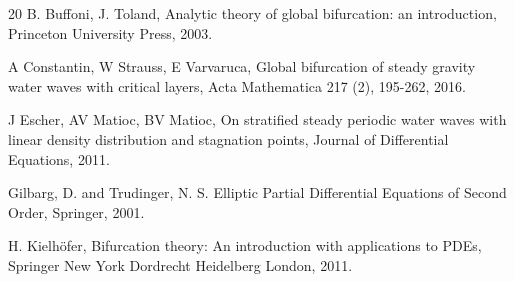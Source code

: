 \documentclass[a4paper,reqno,12pt]{amsart}
\theoremstyle{plain}
\theoremstyle{definition}
\numberwithin{equation}{section}
\begin{document}
{\begin{thebibliography}{20}
 B. Buffoni, J. Toland, Analytic theory of global bifurcation: an introduction, Princeton University Press, 2003.





 A Constantin, W Strauss, E Varvaruca, Global bifurcation of steady gravity water waves with critical layers,
Acta Mathematica 217 (2), 195-262, 2016.


 J Escher, AV Matioc, BV Matioc, On stratified steady periodic water
waves with linear density distribution and stagnation points,
Journal of Differential Equations, 2011.

 Gilbarg, D. and Trudinger, N. S.  Elliptic Partial Differential Equations of Second Order,
Springer, 2001.

 H. Kielhöfer, Bifurcation theory: An introduction with applications to PDEs, Springer New York Dordrecht Heidelberg London, 2011.







\end{thebibliography}}
\end{document}
